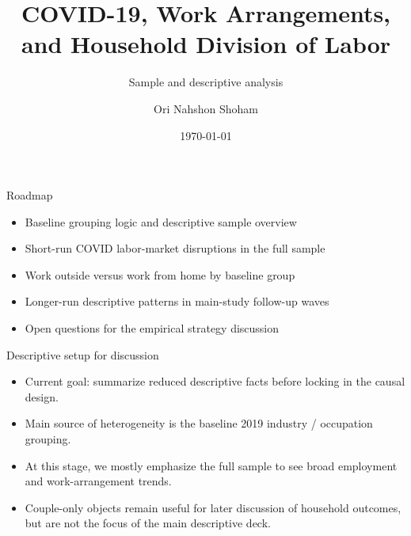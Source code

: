 \documentclass[aspectratio=169,11pt]{beamer}
\title{COVID-19, Work Arrangements, and Household Division of Labor}
\subtitle{Sample and descriptive analysis}
\author{Ori Nahshon Shoham}
\date{\today}
\begin{document}
\begin{frame}
  \titlepage
\end{frame}

\begin{frame}{Roadmap}
\begin{itemize}
  \item Baseline grouping logic and descriptive sample overview
  \item Short-run COVID labor-market disruptions in the full sample
  \item Work outside versus work from home by baseline group
  \item Longer-run descriptive patterns in main-study follow-up waves
  \item Open questions for the empirical strategy discussion
\end{itemize}
\end{frame}

\begin{frame}{Descriptive setup for discussion}
\begin{itemize}
  \item Current goal: summarize reduced descriptive facts before locking in the causal design.
  \item Main source of heterogeneity is the baseline 2019 industry / occupation grouping.
  \item At this stage, we mostly emphasize the full sample to see broad employment and work-arrangement trends.
  \item Couple-only objects remain useful for later discussion of household outcomes, but are not the focus of the main descriptive deck.
\end{itemize}
\vspace{0.5em}
\end{frame}
\end{document}
